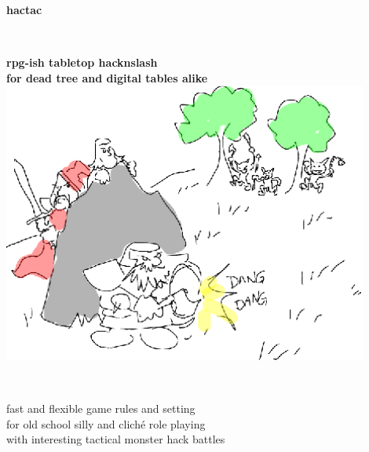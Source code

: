 \documentclass[11pt, twoside, titlepage, a4paper]{report}
\begin{document}

\begin{titlepage}

\begin{center}

   \vspace{4 cm} %

   \textbf{\Huge{hactac}}

   \ %

   \textbf{\Large{rpg-ish tabletop hacknslash\\for dead tree and digital tables alike}}\\


   \vspace{2 cm} %
   \includegraphics[width=120mm]{./figs/attack.eps}

   \vspace{2 cm} %


   \ %

   \large{
       fast and flexible game rules and setting\\
       for old school silly and cliché role playing\\
       with interesting tactical monster hack battles\\
   }




\end{center}
\end{titlepage}
\end{document}
